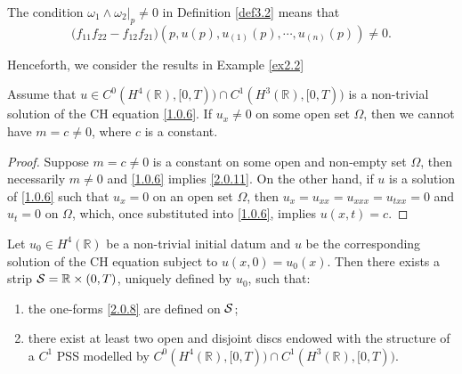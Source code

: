 \documentclass{cimart}
\begin{document}
\begin{remark}
The condition $\omega_1\wedge\omega_2\big|_{p}\neq0$ in Definition \ref{def3.2} means that
$$\Big(f_{11}f_{22}-f_{12}f_{21}\Big)(p,u(p),u_{(1)}(p),\cdots,u_{(n)}(p))\neq0.$$
\end{remark}

Henceforth, we consider the results in Example \ref{ex2.2}

\begin{lemma}\label{lema3.1}
    Assume that $u\in C^{0}(H^{4}(\mathbb{R}),[0,T))\cap C^{1}(H^{3}(\mathbb{R}),[0,T))$ is a non-trivial solution of the CH equation \eqref{1.0.6}. If $u_x\neq 0$ on some open set $\Omega$, then we cannot have $m=c\neq 0$, where $c$ is a constant.
\end{lemma}

\begin{proof}
    Suppose $m=c\neq 0$ is a constant on some open and non-empty set $\Omega$, then necessarily $m\neq 0$ and \eqref{1.0.6} implies \eqref{2.0.11}. On the other hand, if $u$ is a solution of \eqref{1.0.6} such that $u_x=0$ on an open set $\Omega$, then $u_x=u_{xx}=u_{xxx}=u_{txx}=0$ and $u_t=0$ on $\Omega$, which, once substituted into \eqref{1.0.6}, implies $u(x,t)=c$.
\end{proof}

\begin{theorem}\label{teo3.1}
    Let $u_0\in H^4(\mathbb{R})$ be a non-trivial initial datum and $u$ be the corresponding solution of the CH equation subject to $u(x,0)=u_0(x)$. Then there exists a strip ${\cal S}=\mathbb{R}\times(0,T)$, uniquely defined by $u_0$, such that:
    \begin{enumerate}
        \item the one-forms \eqref{2.0.8} are defined on ${\cal S}$;
        \item there exist at least two open and disjoint discs endowed with the structure of a $C^1$ PSS modelled by $C^{0}(H^{4}(\mathbb{R}),[0,T))\cap C^{1}(H^{3}(\mathbb{R}),[0,T))$.
    \end{enumerate}
\end{theorem}
\end{document}
